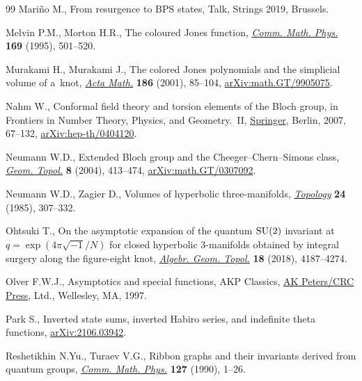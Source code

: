 \documentclass[pdftex]{sigma}
\numberwithin{equation}{section}
\begin{document}
\begin{thebibliography}{99}
Mari\~no M., From resurgence to {BPS} states, {T}alk, Strings 2019, Brussels.

Melvin P.M., Morton H.R., The coloured {J}ones function, \href{https://doi.org/10.1007/BF02099310}{\textit{Comm. Math.
  Phys.}} \textbf{169} (1995), 501--520.

Murakami H., Murakami J., The colored {J}ones polynomials and the simplicial
  volume of a~knot, \href{https://doi.org/10.1007/BF02392716}{\textit{Acta Math.}} \textbf{186} (2001), 85--104,
  \href{https://arxiv.org/abs/math.GT/9905075}{arXiv:math.GT/9905075}.

Nahm W., Conformal field theory and torsion elements of the {B}loch group, in
  Frontiers in Number Theory, Physics, and Geometry.~{II}, \href{https://doi.org/10.1007/978-3-540-30308-4_2}{Springer}, Berlin,
  2007, 67--132, \href{https://arxiv.org/abs/hep-th/0404120}{arXiv:hep-th/0404120}.

Neumann W.D., Extended {B}loch group and the {C}heeger--{C}hern--{S}imons
  class, \href{https://doi.org/10.2140/gt.2004.8.413}{\textit{Geom. Topol.}} \textbf{8} (2004), 413--474,
  \href{https://arxiv.org/abs/math.GT/0307092}{arXiv:math.GT/0307092}.

Neumann W.D., Zagier D., Volumes of hyperbolic three-manifolds,
  \href{https://doi.org/10.1016/0040-9383(85)90004-7}{\textit{Topology}} \textbf{24} (1985), 307--332.

Ohtsuki T., On the asymptotic expansion of the quantum {$\rm SU(2)$} invariant
  at {$q=\exp(4\pi\sqrt{-1}/N)$} for closed hyperbolic 3-manifolds obtained by
  integral surgery along the figure-eight knot, \href{https://doi.org/10.2140/agt.2018.18.4187}{\textit{Algebr. Geom. Topol.}}
  \textbf{18} (2018), 4187--4274.

Olver F.W.J., Asymptotics and special functions, AKP Classics, \href{https://doi.org/10.1201/9781439864548}{AK Peters/CRC
  Press}, Ltd., Wellesley, MA, 1997.

Park S., Inverted state sums, inverted {H}abiro series, and indefinite theta
  functions, \href{https://arxiv.org/abs/2106.03942}{arXiv:2106.03942}.

Reshetikhin N.Yu., Turaev V.G., Ribbon graphs and their invariants derived from
  quantum groups, \href{https://doi.org/10.1007/BF02096491}{\textit{Comm. Math. Phys.}} \textbf{127} (1990), 1--26.


\end{thebibliography}
\end{document}
